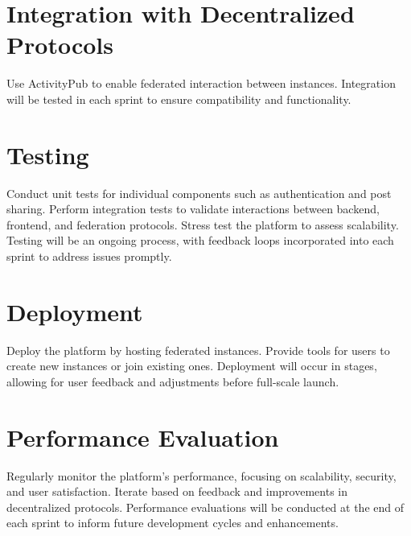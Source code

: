\section{Integration with Decentralized Protocols}
Use ActivityPub to enable federated interaction between instances. Integration will be tested in each sprint to ensure compatibility and functionality.

\section{Testing}
Conduct unit tests for individual components such as authentication and post sharing. Perform integration tests to validate interactions between backend, frontend, and federation protocols. Stress test the platform to assess scalability. Testing will be an ongoing process, with feedback loops incorporated into each sprint to address issues promptly.

\section{Deployment}
Deploy the platform by hosting federated instances. Provide tools for users to create new instances or join existing ones. Deployment will occur in stages, allowing for user feedback and adjustments before full-scale launch.

\section{Performance Evaluation}
Regularly monitor the platform’s performance, focusing on scalability, security, and user satisfaction. Iterate based on feedback and improvements in decentralized protocols. Performance evaluations will be conducted at the end of each sprint to inform future development cycles and enhancements.
